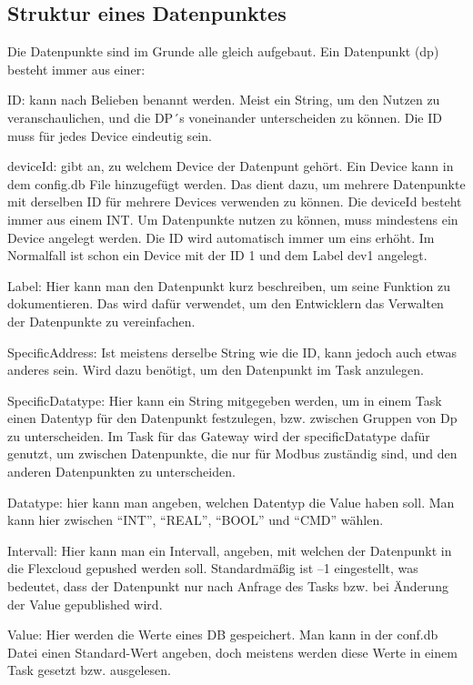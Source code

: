 \UseRawInputEncoding
\subsection{Struktur eines Datenpunktes}

Die Datenpunkte sind im Grunde alle gleich aufgebaut. Ein Datenpunkt (dp) besteht immer aus einer: 

\begin{compactitem}
    \item ID: kann nach Belieben benannt werden. Meist ein String, um den Nutzen zu veranschaulichen, und die DP´s voneinander unterscheiden zu können. Die ID muss für jedes Device eindeutig sein. 
    \item deviceId: gibt an, zu welchem Device der Datenpunt gehört. Ein Device kann in dem config.db File hinzugefügt werden. Das dient dazu, um mehrere Datenpunkte mit derselben ID für mehrere Devices verwenden zu können. Die deviceId besteht immer aus einem INT. Um Datenpunkte nutzen zu können, muss mindestens ein Device angelegt werden. Die ID wird automatisch immer um eins erhöht. Im Normalfall ist schon ein Device mit der ID 1 und dem Label dev1 angelegt.  
\item Label: Hier kann man den Datenpunkt kurz beschreiben, um seine Funktion zu dokumentieren. Das wird dafür verwendet, um den Entwicklern das Verwalten der Datenpunkte zu vereinfachen.  
\item SpecificAddress: Ist meistens derselbe String wie die ID, kann jedoch auch etwas anderes sein. Wird dazu benötigt, um den Datenpunkt im Task anzulegen.  
\item SpecificDatatype: Hier kann ein String mitgegeben werden, um in einem Task einen Datentyp für den Datenpunkt festzulegen, bzw. zwischen Gruppen von Dp zu unterscheiden. Im Task für das Gateway wird der specificDatatype dafür genutzt, um zwischen Datenpunkte, die nur für Modbus zuständig sind, und den anderen Datenpunkten zu unterscheiden.  
\item Datatype: hier kann man angeben, welchen Datentyp die Value haben soll. Man kann hier zwischen “INT”, “REAL”, “BOOL” und “CMD” wählen.  
\item Intervall: Hier kann man ein Intervall, angeben, mit welchen der Datenpunkt in die Flexcloud gepushed werden soll. Standardmäßig ist –1 eingestellt, was bedeutet, dass der Datenpunkt nur nach Anfrage des Tasks bzw. bei Änderung der Value gepublished wird.  
\item Value: Hier werden die Werte eines DB gespeichert. Man kann in der conf.db Datei einen Standard-Wert angeben, doch meistens werden diese Werte in einem Task gesetzt bzw. ausgelesen.
\end{compactitem}

